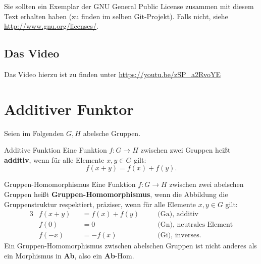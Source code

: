 \documentclass[a4paper]{amsart}
\theoremstyle{definition}
\begin{document}
Sie sollten ein Exemplar der GNU General Public License zusammen mit diesem Text erhalten haben 
(zu finden im selben Git-Projekt). 
Falls nicht, siehe \url{http://www.gnu.org/licenses/}.

\subsection*{Das Video}
Das Video hierzu ist zu finden unter 
{\tiny
   \url{https://youtu.be/zSP_a2RvoYE}
}

\section{Additiver Funktor}
Seien im Folgenden $G, H$ abelsche Gruppen.
\begin{Definition}{Additive Funktion}
   Eine Funktion $f \colon G \to H$ zwischen zwei Gruppen heißt \textbf{additiv}, wenn für alle Elemente $x,y \in G$ gilt:
   \begin{equation}
      f(x+y) = f(x) + f(y).
   \end{equation}
\end{Definition} 

\begin{Definition}{Gruppen-Homomorphismus}
   Eine Funktion $f \colon G \to H$ zwischen zwei abelschen Gruppen heißt \textbf{Gruppen-Homomorphismus}, wenn die Abbildung die Gruppenstruktur respektiert, präziser, wenn für alle Elemente $x,y \in G$ gilt:
   \begin{alignat}{3}
      &f(x+y) &&= f(x) + f(y) && \quad \text{(Ga), additiv}\\
      &f(0)   &&= 0           && \quad \text{(Gn), neutrales Element}\\
      &f(-x)  &&= -f(x)       && \quad \text{(Gi), inverses}.
   \end{alignat}
   Ein Gruppen-Homomorphismus zwischen abelschen Gruppen ist nicht anderes als ein Morphismus in \textbf{Ab}, also ein \textbf{Ab}-Hom.
\end{Definition} 
\end{document}
